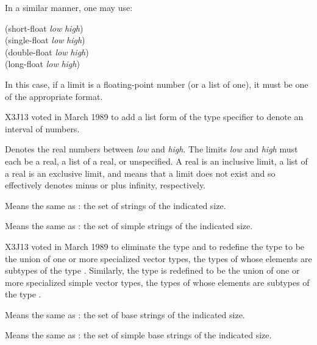 \begin{flushdesc}
In a similar manner, one may use:
\begin{lisp}
(short-float {\it low} {\it high}) \\
(single-float {\it low} {\it high}) \\
(double-float {\it low} {\it high}) \\
(long-float {\it low} {\it high})
\end{lisp}
In this case, if a limit is a floating-point
number (or a list of one), it must be one of the appropriate format.
\end{flushdesc}

\begin{newer}
X3J13 voted in March 1989  to add a list form of the 
type specifier to denote an interval of  numbers.

\begin{flushdesc}
\item[\cd{(real {\it low} {\it high})}]
Denotes the real numbers between
{\it low} and {\it high}.  The limits {\it low} and {\it high}
must each be a real, a list of a real, or unspecified.
A real is an inclusive limit,
a list of a real is an exclusive limit, and
\cd{*} means that a limit does not exist
and so effectively denotes minus or plus infinity, respectively.
\end{flushdesc}
\end{newer}

\begin{obsolete}
\begin{flushdesc}
\item[\cd{(string {\it size})}]
Means the same as
: the set of strings of the indicated size.

\item[\cd{(simple-string {\it size})}]
Means the same
as : the set of simple
strings of the indicated size.
\end{flushdesc}
\end{obsolete}

\begin{newer}
X3J13 voted in March 1989 
to eliminate the type  and to redefine the type
 to be the union of one or more specialized vector
types, the types of whose elements are subtypes of the type .
Similarly, the type
 is redefined to be the union of one or more specialized
simple vector
types, the types of whose elements are subtypes of the type .

\begin{flushdesc}
\item[\cd{(base-string {\it size})}]
Means the same as
: the set of base
strings of the indicated size.


\item[\cd{(simple-base-string {\it size})}]
Means the same
as : the set of simple base
strings of the indicated size.
\end{flushdesc}
\end{newer}

